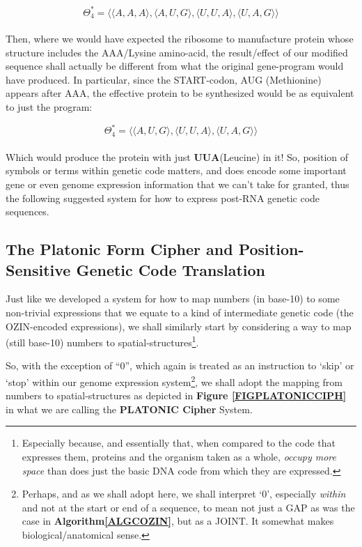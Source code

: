 \documentclass[a4paper, 18pt]{book} %
\begin{document}
 \begin{equation}
\label{EQ6B}
\Theta_4^* = \langle \langle A, A, A \rangle, \langle A, U, G \rangle, \langle U, U, A \rangle, \langle U, A, G \rangle \rangle
\end{equation}\\


Then, where we would have expected the ribosome to manufacture protein whose structure includes the AAA/Lysine amino-acid, the result/effect of our modified sequence shall actually be different from what the original gene-program would have produced. In particular, since the START-codon, AUG (Methionine) appears after AAA, the effective protein to be synthesized would be as equivalent to just the program:

 \begin{equation}
\label{EQ6C}
\Theta_4^* = \langle \langle A, U, G \rangle, \langle U, U, A \rangle, \langle U, A, G \rangle \rangle
\end{equation}\\

Which would produce the protein with just \textbf{UUA}(Leucine) in it! So, position of symbols or terms within genetic code matters, and does encode some important gene or even genome expression information that we can't take for granted, thus the following suggested system for how to express post-RNA genetic code sequences.

\subsection{The Platonic Form Cipher and Position-Sensitive Genetic Code Translation}
\label{SECPLATONIC}

Just like we developed a system for how to map numbers (in base-10) to some non-trivial expressions that we equate to a kind of intermediate genetic code (the OZIN-encoded expressions), we shall similarly start by considering a way to map (still base-10) numbers to spatial-structures\footnote{Especially because, and essentially that, when compared to the code that expresses them, proteins and the organism taken as a whole, \textit{occupy more space} than does just the basic DNA code from which they are expressed.}.

So, with the exception of ``0'', which again is treated as an instruction to `skip' or `stop' within our genome expression system\footnote{Perhaps, and as we shall adopt here, we shall interpret `0', especially \textit{within} and not at the start or end of a sequence, to mean not just a GAP as was the case in \textbf{Algorithm\ref{ALGCOZIN}}, but as a JOINT. It somewhat makes biological/anatomical sense.}, we shall adopt the mapping from numbers to spatial-structures as depicted in \textbf{Figure \ref{FIGPLATONICCIPH}} in what we are calling the \textbf{PLATONIC Cipher} System\cite{lutalo_2025_platonic}.
\end{document}
